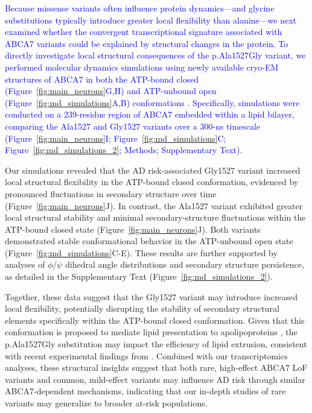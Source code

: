 \newcommand{\quoteP}{\textcolor{blue}{Because missense variants often influence protein dynamics—and glycine substitutions typically introduce greater local flexibility than alanine—we next examined whether the convergent transcriptional signature associated with ABCA7 variants could be explained by structural changes in the protein. To directly investigate local structural consequences of the p.Ala1527Gly variant, we performed molecular dynamics simulations using newly available cryo-EM structures of ABCA7 in both the ATP-bound closed (Figure~\ref{fig:main_neurons}G,H) and ATP-unbound open (Figure~\ref{fig:md_simulations}A,B) conformations \cite{LeThiMy2022-dp,Jumper2021-na}. Specifically, simulations were conducted on a 239-residue region of ABCA7 embedded within a lipid bilayer, comparing the Ala1527 and Gly1527 variants over a 300-ns timescale (Figure~\ref{fig:main_neurons}I; Figure~\ref{fig:md_simulations}C; Figure~\ref{fig:md_simulations_2}; Methods; Supplementary Text).\label{quoteL-labelP}}}\quoteP

Our simulations revealed that the AD risk-associated Gly1527 variant increased local structural flexibility in the ATP-bound closed conformation, evidenced by pronounced fluctuations in secondary structure over time (Figure~\ref{fig:main_neurons}J). In contrast, the Ala1527 variant exhibited greater local structural stability and minimal secondary-structure fluctuations within the ATP-bound closed state (Figure~\ref{fig:main_neurons}J). Both variants demonstrated stable conformational behavior in the ATP-unbound open state (Figure~\ref{fig:md_simulations}C-E). These results are further supported by analyses of $\phi$/$\psi$ dihedral angle distributions and secondary structure persistence, as detailed in the Supplementary Text (Figure~\ref{fig:md_simulations_2}).

Together, these data suggest that the Gly1527 variant may introduce increased local flexibility, potentially disrupting the stability of secondary structural elements specifically within the ATP-bound closed conformation. Given that this conformation is proposed to mediate lipid presentation to apolipoproteins \cite{LeThiMy2022-dp,Fang2025}, the p.Ala1527Gly substitution may impact the efficiency of lipid extrusion, consistent with recent experimental findings from \cite{Fang2025}. Combined with our transcriptomics analyses, these structural insights suggest that both rare, high-effect ABCA7 LoF variants and common, mild-effect variants may influence AD risk through similar ABCA7-dependent mechanisms, indicating that our in-depth studies of rare variants may generalize to broader at-risk populations.


